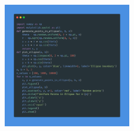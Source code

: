 \documentclass[a4paper,12pt]{article}
\begin{document}
\begin{figure}[h!]
    \centering
    \includegraphics[width=0.5\textwidth]{./Screenshots/Exercise5.py.png} 
\end{figure} \\
\end{document}

